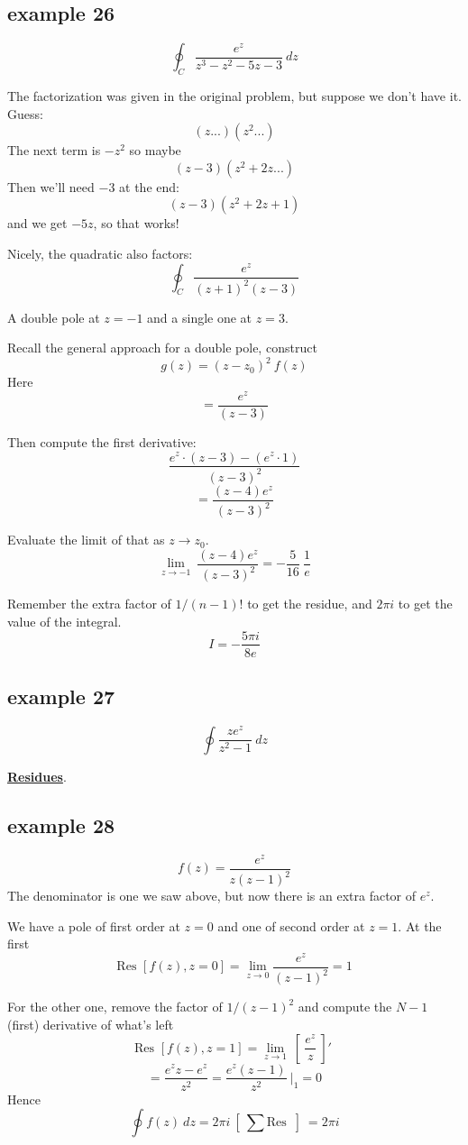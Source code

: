 \documentclass[11pt, oneside]{article}
\begin{document}
\subsection*{example 26}
\[ \oint_C \frac{e^z}{z^3 - z^2 - 5z - 3} \ dz \]

The factorization was given in the original problem, but suppose we don't have it.  Guess:
\[ (z ...)(z^2 ... ) \]
The next term is $-z^2$ so maybe 
\[ (z -3)(z^2 + 2z ... ) \]
Then we'll need $-3$ at the end:
\[ (z - 3)(z^2 + 2z + 1) \]
and we get $-5z$, so that works!

Nicely, the quadratic also factors:
\[ \oint_C \frac{e^z}{(z+1)^2 (z-3)} \]

A double pole at $z = -1$ and a single one at $z = 3$.

Recall the general approach for a double pole, construct
\[ g(z) = (z - z_0)^2 \ f(z) \]
Here
\[ = \frac{e^z}{(z-3)} \]

Then compute the first derivative:
\[ \frac{e^z \cdot (z-3) - (e^z \cdot 1)}{(z - 3)^2} \]
\[ = \frac{(z-4)e^z}{(z-3)^2} \]

Evaluate the limit of that as $z \rightarrow z_0$.
\[ \lim_{z \rightarrow -1} \ \frac{(z-4)e^z}{(z-3)^2} = -\frac{5}{16} \ \frac{1}{e} \]

Remember the extra factor of $1/(n-1)!$ to get the residue, and $2 \pi i$ to get the value of the integral.
\[ I = -\frac{5 \pi i}{8 e} \]

\subsection*{example 27}
\[ \oint \frac{z e^z}{z^2 - 1} \ dz \]

\hyperref[sec:ex27R]{\textbf{Residues}}.

\subsection*{example 28}

\[ f(z) = \frac{e^z}{z(z-1)^2} \]
The denominator is one we saw above, but now there is an extra factor of $e^z$.

We have a pole of first order at $z=0$ and one of second order at $z=1$.  At the first
\[ \text{Res } [f(z),z=0] = \lim_{z \rightarrow 0} \frac{e^z}{(z-1)^2} = 1 \]

For the other one, remove the factor of $1/(z-1)^2$ and compute the $N-1$ (first) derivative of what's left
\[ \text{Res } [f(z),z=1] = \lim_{z \rightarrow 1} \ [ \ \frac{e^z}{z} \ ]' \ \]
\[ = \frac{e^z z - e^z}{z^2} = \frac{e^z(z - 1)}{z^2} \ \bigg |_1 =  0 \]
Hence
\[ \oint f(z) \ dz = 2 \pi i \ [ \ \sum  \text{Res } \ ] \ = 2 \pi i \]
\end{document}
